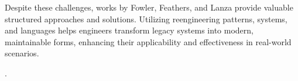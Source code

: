 Despite these challenges, works by Fowler, Feathers, and Lanza provide valuable structured approaches and solutions. Utilizing reengineering patterns, systems, and languages helps engineers transform legacy systems into modern, maintainable forms, enhancing their applicability and effectiveness in real-world scenarios.

\cite{SoftwareEvolutionMens2008}
\cite{RefactoringFowler2002Improving}

\cite{DevelopmentModels2010} \cite{ContinuousEngineering2017}.


